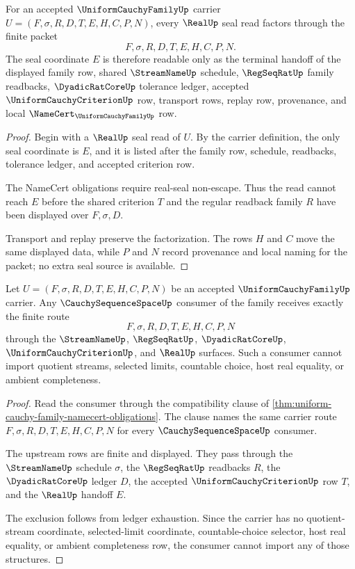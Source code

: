\begin{theorem}
\label{thm:uniform-cauchy-family-real-seal-factorization}
For an accepted $\UniformCauchyFamilyUp$ carrier $U=(F,\sigma,R,D,T,E,H,C,P,N)$, every $\RealUp$ seal read factors through the finite packet
$$
F,\sigma,R,D,T,E,H,C,P,N.
$$
The seal coordinate $E$ is therefore readable only as the terminal handoff of the displayed family row, shared $\StreamNameUp$ schedule, $\RegSeqRatUp$ family readbacks, $\DyadicRatCoreUp$ tolerance ledger, accepted $\UniformCauchyCriterionUp$ row, transport rows, replay row, provenance, and local $\NameCert_{\UniformCauchyFamilyUp}$ row.
\end{theorem}
\begin{proof}
Begin with a $\RealUp$ seal read of $U$. By the carrier definition, the only seal coordinate is $E$, and it is listed after the family row, schedule, readbacks, tolerance ledger, and accepted criterion row.

The NameCert obligations require real-seal non-escape. Thus the read cannot reach $E$ before the shared criterion $T$ and the regular readback family $R$ have been displayed over $F,\sigma,D$.

Transport and replay preserve the factorization. The rows $H$ and $C$ move the same displayed data, while $P$ and $N$ record provenance and local naming for the packet; no extra seal source is available.
\end{proof}

\begin{theorem}
\label{thm:uniform-cauchy-family-cauchy-sequence-space-compatibility}
Let $U=(F,\sigma,R,D,T,E,H,C,P,N)$ be an accepted $\UniformCauchyFamilyUp$ carrier. Any $\CauchySequenceSpaceUp$ consumer of the family receives exactly the finite route
$$
F,\sigma,R,D,T,E,H,C,P,N
$$
through the $\StreamNameUp$, $\RegSeqRatUp$, $\DyadicRatCoreUp$, $\UniformCauchyCriterionUp$, and $\RealUp$ surfaces. Such a consumer cannot import quotient streams, selected limits, countable choice, host real equality, or ambient completeness.
\end{theorem}
\begin{proof}
Read the consumer through the compatibility clause of \autoref{thm:uniform-cauchy-family-namecert-obligations}. The clause names the same carrier route $F,\sigma,R,D,T,E,H,C,P,N$ for every $\CauchySequenceSpaceUp$ consumer.

The upstream rows are finite and displayed. They pass through the $\StreamNameUp$ schedule $\sigma$, the $\RegSeqRatUp$ readbacks $R$, the $\DyadicRatCoreUp$ ledger $D$, the accepted $\UniformCauchyCriterionUp$ row $T$, and the $\RealUp$ handoff $E$.

The exclusion follows from ledger exhaustion. Since the carrier has no quotient-stream coordinate, selected-limit coordinate, countable-choice selector, host real equality, or ambient completeness row, the consumer cannot import any of those structures.
\end{proof}

